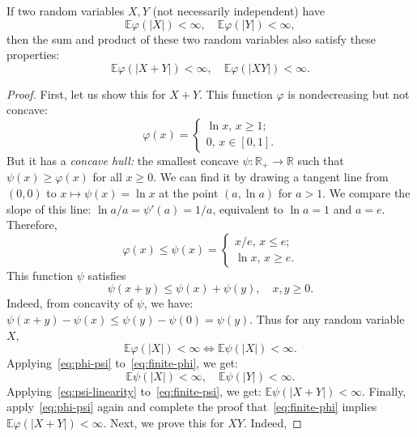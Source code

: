 \documentclass[10pt,a4paper]{amsart}
\begin{document}
\begin{lemma} If two random variables $X, Y$ (not necessarily independent) have 
\begin{equation}
\label{eq:finite-phi}
\mathbb E\varphi(|X|) < \infty,\quad \mathbb E\varphi(|Y|) < \infty,
\end{equation}
then the sum and product of these two random variables also satisfy these properties:
$$
\mathbb E\varphi(|X + Y|) < \infty,\quad \mathbb E\varphi(|XY|) < \infty.
$$
\label{lemma:sum-product}
\end{lemma}

\begin{proof} First, let us show this for $X + Y$. This function $\varphi$ is nondecreasing but not concave:
$$
\varphi(x) = 
\begin{cases} 
\ln x, \, x \ge 1;\\ 
0,\, x \in [0, 1]. 
\end{cases}
$$
But it has a {\it concave hull:} the smallest concave $\psi : \mathbb R_+ \to \mathbb R$ such that $\psi(x) \ge \varphi(x)$ for all $x \ge 0$. We can find it by drawing a tangent line from $(0, 0)$ to $x \mapsto \psi(x) = \ln x$ at the point $(a, \ln a)$ for $a > 1$. We compare the slope of this line: $\ln a/a = \psi'(a) = 1/a$, equivalent to  $\ln a = 1$ and $a = e$. Therefore,
$$
\varphi(x) \le \psi(x) = 
\begin{cases}
x/e,\, x \le e;\\
\ln x,\, x \ge e.
\end{cases}
$$
This function $\psi$ satisfies 
\begin{equation}
\label{eq:psi-linearity}
\psi(x + y) \le \psi(x) + \psi(y),\quad x, y \ge 0.
\end{equation}
Indeed, from concavity of $\psi$, we have: $\psi(x + y) - \psi(x) \le \psi(y) - \psi(0) = \psi(y)$. Thus for any random variable $X$, 
\begin{equation}
\label{eq:phi-psi}
\mathbb E\varphi(|X|) < \infty \Leftrightarrow \mathbb E\psi(|X|) < \infty.
\end{equation}
Applying~\eqref{eq:phi-psi} to~\eqref{eq:finite-phi}, we get: 
\begin{equation}
\label{eq:finite-psi}
\mathbb E\psi(|X|) < \infty,\quad \mathbb E\psi(|Y|) < \infty.
\end{equation}
Applying~\eqref{eq:psi-linearity} to~\eqref{eq:finite-psi}, we get: $\mathbb E\psi(|X + Y|) < \infty$. Finally, apply~\eqref{eq:phi-psi} again and complete the proof that~\eqref{eq:finite-phi} implies $\mathbb E\varphi(|X + Y|) < \infty$. Next, we prove this for $XY$. Indeed, 

\end{proof}
\end{document}
